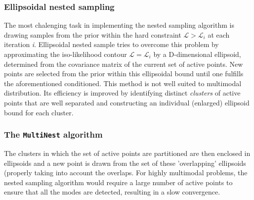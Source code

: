 \subsubsection{Ellipsoidal nested sampling}
The most chalenging task in implementing the nested sampling algorithm is drawing samples from the prior within the hard constraint $\mathcal{L} > \mathcal{L}_i$ at each iteration \textit{i}. 
Ellipsoidal nested sample tries to overcome this problem by approximating the iso-likelihood contour $\mathcal{L} = \mathcal{L}_i$ by a D-dimensional ellipsoid, determined from the covariance matrix of the current set of active points. New points are selected from the prior within this ellipsoidal bound until one fulfills the aforementioned conditioned. 
This method is not well suited to multimodal distribution. Its efficiency is improved by identifying distinct \textit{clusters} of active points that are well separated and constructing an individual (enlarged) ellipsoid bound for each cluster. 

\subsubsection{The \texttt{MultiNest} algorithm}
The clusters in which the set of active points are partitioned are then enclosed in ellipsoids and a new point is drawn from the set of these 'overlapping' ellipsoids (properly taking into account the overlaps. For highly multimodal problems, the nested sampling algorithm would require a large number of active points to ensure that all the modes are detected, resulting in a slow convergence.  


